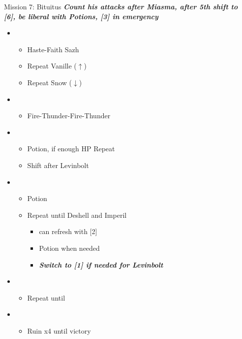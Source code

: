 \begin{battle}{Mission 7: Bituitus}
	\textit{\textbf{Count his attacks after Miasma, after 5th shift to [6], be liberal with Potions, [3] in emergency}}
	\begin{itemize}
		\item \fourth
			\begin{itemize}
				\item Haste-Faith Sazh
				\item Repeat Vanille ($\uparrow$)
				\item Repeat Snow ($\downarrow$)
			\end{itemize}
		\item \third
			\begin{itemize}
				\item Fire-Thunder-Fire-Thunder
			\end{itemize}
		\item \first
			\begin{itemize}
				\item Potion, if enough HP Repeat
				\item Shift after Levinbolt
			\end{itemize}
		\item \third
			\begin{itemize}
				\item Potion
				\item Repeat until Deshell and Imperil
					\begin{itemize}
						\item can refresh with [2]
						\item Potion when needed
						\item \textbf{\textit{Switch to [1] if needed for Levinbolt}}
					\end{itemize}
			\end{itemize}
		\item \second
			\begin{itemize}
				\item Repeat until \stagger
			\end{itemize}
		\item \fifth
			\begin{itemize}
				\item Ruin x4 until victory
			\end{itemize}
	\end{itemize}
\end{battle}

